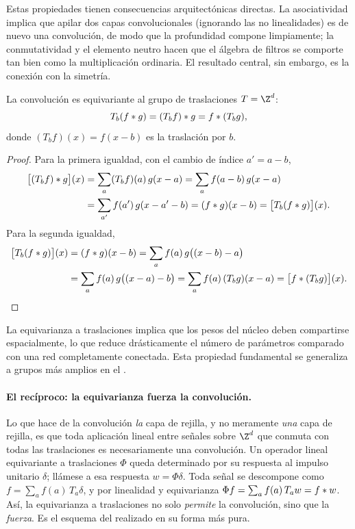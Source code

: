 Estas propiedades tienen consecuencias arquitect\'onicas directas. La
asociatividad implica que apilar dos capas convolucionales (ignorando las no
linealidades) es de nuevo una convoluci\'on, de modo que la profundidad compone
limpiamente; la conmutatividad y el elemento neutro hacen que el \'algebra de
filtros se comporte tan bien como la multiplicaci\'on ordinaria. El resultado
central, sin embargo, es la conexi\'on con la simetr\'ia.

\begin{theorem}
\label{thm:grids:equivariance}
La convoluci\'on es equivariante al grupo de traslaciones $T = \Z^d$:
\[
  T_b(f * g) = (T_b f) * g = f * (T_b g),
\]
donde $(T_b f)(x) = f(x-b)$ es la traslaci\'on por $b$.
\end{theorem}

\begin{proof}
Para la primera igualdad, con el cambio de \'indice $a' = a - b$,
\begin{align}
\big[(T_b f) * g\big](x)
  &= \sum_a (T_b f)(a)\, g(x - a) = \sum_a f(a - b)\, g(x - a) \nonumber \\
  &= \sum_{a'} f(a')\, g(x - a' - b) = (f * g)(x - b)
   = \big[T_b(f * g)\big](x).
\end{align}
Para la segunda igualdad,
\begin{align}
\big[T_b(f * g)\big](x)
  &= (f * g)(x - b) = \sum_a f(a)\, g\big((x - b) - a\big) \nonumber \\
  &= \sum_a f(a)\, g\big((x - a) - b\big) = \sum_a f(a)\,(T_b g)(x - a)
   = \big[f * (T_b g)\big](x).
\end{align}
\end{proof}

La equivarianza a traslaciones implica que los pesos del n\'ucleo deben
compartirse espacialmente, lo que reduce dr\'asticamente el n\'umero de
par\'ametros comparado con una red completamente conectada. Esta propiedad
fundamental se generaliza a grupos m\'as amplios en el .

\paragraph{El rec\'iproco: la equivarianza fuerza la convoluci\'on.}
Lo que hace de la convoluci\'on \emph{la} capa de rejilla, y no meramente
\emph{una} capa de rejilla, es que toda aplicaci\'on lineal entre se\~nales
sobre $\Z^d$ que conmuta con todas las traslaciones es necesariamente una
convoluci\'on. Un operador lineal equivariante a traslaciones $\Phi$ queda
determinado por su respuesta al impulso unitario $\delta$; ll\'amese a esa
respuesta $w = \Phi\delta$. Toda se\~nal se descompone como
$f = \sum_a f(a)\, T_a \delta$, y por linealidad y equivarianza
$\Phi f = \sum_a f(a)\, T_a w = f * w$. As\'i, la equivarianza a
traslaciones no solo \emph{permite} la convoluci\'on, sino que la \emph{fuerza}.
Es el esquema del  realizado en su forma m\'as pura.

